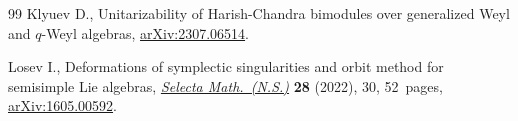 \documentclass[pdftex]{sigma}
\numberwithin{equation}{section}
\theoremstyle{definition}
\begin{document}
\begin{thebibliography}{99}
Klyuev D., Unitarizability of {H}arish-{C}handra bimodules over generalized
 {W}eyl and $q$-{W}eyl algebras,
 \href{http://arxiv.org/abs/2307.06514}{arXiv:2307.06514}.

Losev I., Deformations of symplectic singularities and orbit method for
 semisimple {L}ie algebras,
 \href{https://doi.org/10.1007/s00029-021-00754-y}{\textit{Selecta
 Math.~(N.S.)}} \textbf{28} (2022), 30, 52~pages,
 \href{http://arxiv.org/abs/1605.00592}{arXiv:1605.00592}.

\end{thebibliography}\LastPageEnding
\end{document}
